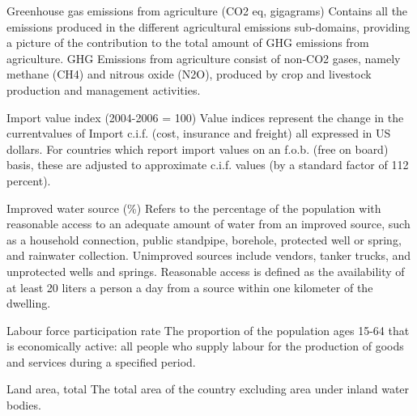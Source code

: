 \begin{MetadataCollection} {}
\begin{Energy consumption in agriculture, total} {}
\begin{metadata}{Greenhouse gas emissions from agriculture (CO2 eq, gigagrams)} {}
Contains all the emissions produced in the different agricultural emissions sub-domains, providing a picture of the contribution to the total amount of GHG emissions from agriculture.  GHG Emissions from agriculture consist of non-CO2 gases, namely methane (CH4) and nitrous oxide (N2O), produced by crop and livestock production and management activities.
\end{metadata}

\begin{metadata}{Import value index (2004-2006 = 100)} {}
Value indices represent the change in the currentvalues of Import c.i.f. (cost, insurance and freight) all expressed in US dollars. For countries which report import values on an f.o.b. (free on board) basis, these are adjusted to approximate c.i.f. values (by a standard factor of 112 percent).
\end{metadata}

\begin{metadata}{Improved water source (\%)} {}
Refers to the percentage of the population with reasonable access to an adequate amount of water from an improved source, such as a household connection, public standpipe, borehole, protected well or spring, and rainwater collection. Unimproved sources include vendors, tanker trucks, and unprotected wells and springs. Reasonable access is defined as the availability of at least 20 liters a person a day from a source within one kilometer of the dwelling.
\end{metadata}

\begin{metadata}{Labour force participation rate} {}
The proportion of the population ages 15-64 that is economically active: all people who supply labour for the production of goods and services during a specified period.
\end{metadata}

\begin{metadata}{Land area, total} {}
The total area of the country excluding area under inland water bodies.
\end{metadata}


\end{Energy consumption in agriculture, total}
\end{MetadataCollection}
